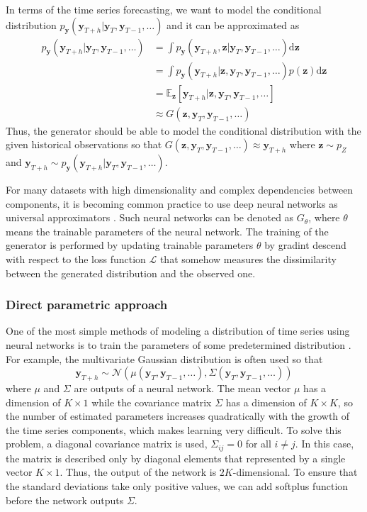 \documentclass[12pt,a4paper]{article}
\begin{document}
In terms of the time series forecasting, we want to model the conditional distribution $p_\mathbf y(\mathbf y_{T+h} | \mathbf y_{T}, \mathbf y_{T-1}, \dots)$ and it can be approximated as
\begin{equation}\label{eq:gen}
\begin{aligned}
p_\mathbf y(\mathbf y_{T+h} | \mathbf y_{T}, \mathbf y_{T-1}, \dots) &= \int p_\mathbf y(\mathbf y_{T+h}, \mathbf z| \mathbf y_{T}, \mathbf y_{T-1}, \dots)\mathrm{d}\mathbf z\\ 
&= \int p_\mathbf y(\mathbf y_{T+h} | \mathbf z, \mathbf y_{T}, \mathbf y_{T-1}, \dots)p(\mathbf z) \mathrm{d}\mathbf z\\ 
&= \mathbb E_\mathbf z[\mathbf y_{T+h} | \mathbf z, \mathbf y_{T}, \mathbf y_{T-1}, \dots]\\ 
&\approx G(\mathbf z, \mathbf y_{T}, \mathbf y_{T-1}, \dots)        
\end{aligned}
\end{equation}
Thus, the generator should be able to model the conditional distribution with the given historical observations so that $G(\mathbf z, \mathbf y_{T}, \mathbf y_{T-1}, \dots) \approx \mathbf y_{T+h}$ where $\mathbf z \sim p_Z$ and $\mathbf y_{T+h} \sim p_\mathbf y(\mathbf y_{T+h} | \mathbf y_{T}, \mathbf y_{T-1}, \dots)$.

For many datasets with high dimensionality and complex dependencies between components, it is becoming common practice to use deep neural networks as universal approximators \cite{introductiondgm2021}. Such neural networks can be denoted as $G_\theta$, where $\theta$ means the trainable parameters of the neural network. The training of the generator is performed by updating trainable parameters $\theta$ by gradint descend with respect to the loss function $\mathcal L$ that somehow measures the dissimilarity between the generated distribution and the observed one.

\subsubsection{Direct parametric approach}

One of the most simple methods of modeling a distribution of time series using neural networks is to train the parameters of some predetermined distribution \cite{tsdeeplearning2021}. For example, the multivariate Gaussian distribution is often used so that
$$\mathbf y_{T+h} \sim \mathcal N(\mu(\mathbf y_{T}, \mathbf y_{T-1}, \dots), \Sigma(\mathbf y_{T}, \mathbf y_{T-1}, \dots))$$
where $\mu$ and $\Sigma$ are outputs of a neural network. The mean vector $\mu$ has a dimension of $K \times 1$ while the covariance matrix $\Sigma$ has a dimension of $K \times K$, so the number of estimated parameters increases quadratically with the growth of the time series components, which makes learning very difficult. To solve this problem, a diagonal covariance matrix is used, $\Sigma_{ij} = 0$ for all $i \neq j$. In this case, the matrix is described only by diagonal elements that represented by a single vector $K \times 1$. Thus, the output of the network is $2K$-dimensional. To ensure that the standard deviations take only positive values, we can add softplus function before the network outputs $\Sigma$.
\end{document}
